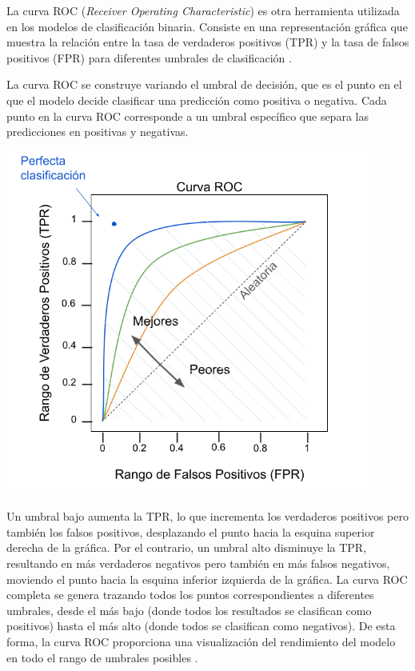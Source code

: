\begin{minipage}{0.5\textwidth}
La curva ROC (\textit{Receiver Operating Characteristic}) es otra herramienta utilizada en los modelos de clasificación binaria. Consiste en una representación gráfica que muestra la relación entre la tasa de verdaderos positivos (TPR) y la tasa de falsos positivos (FPR) para diferentes umbrales de clasificación \citep{geron2022hands}. 

\bigskip

La curva ROC se construye variando el umbral de decisión, que es el punto en el que el modelo decide clasificar una predicción como positiva o negativa. Cada punto en la curva ROC corresponde a un umbral específico que separa las predicciones en positivas y negativas. 
\end{minipage}
\begin{minipage}{0.05\textwidth}
\textbf{ }
\end{minipage}
\begin{minipage}{0.4\textwidth}
	\includegraphics[width=0.9\textwidth]{img/roc.png}
	\label{img: roc}
\end{minipage}

Un umbral bajo aumenta la TPR, lo que incrementa los verdaderos positivos pero también los falsos positivos, desplazando el punto hacia la esquina superior derecha de la gráfica. Por el contrario, un umbral alto disminuye la TPR, resultando en más verdaderos negativos pero también en más falsos negativos, moviendo el punto hacia la esquina inferior izquierda de la gráfica. La curva ROC completa se genera trazando todos los puntos correspondientes a diferentes umbrales, desde el más bajo (donde todos los resultados se clasifican como positivos) hasta el más alto (donde todos se clasifican como negativos). De esta forma, la curva ROC proporciona una visualización del rendimiento del modelo en todo el rango de umbrales posibles \citep{geron2022hands}.

